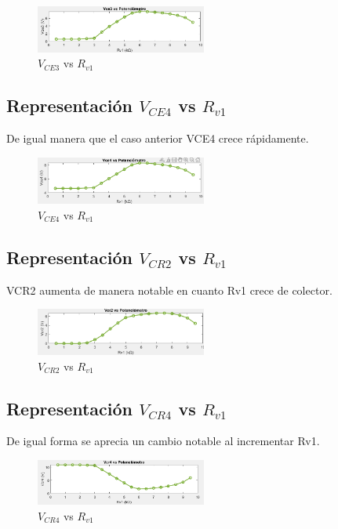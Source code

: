 \documentclass[conference]{IEEEtran}
\begin{document}
    \begin{figure}[h]
        \centering
        \includegraphics[width=0.5\textwidth]{media/IMAGENES MATLAB/VCE3_R.png}
          \caption{$V_{CE3}$ vs $R_{v1}$}
        \label{fig:vce3}
    \end{figure}
    
    \subsection{ Representación $V_{CE4}$ vs $R_{v1}$}
    De igual manera que el caso anterior VCE4 crece rápidamente.
    
    \begin{figure}[h]
        \centering
        \includegraphics[width=0.5\textwidth]{media/IMAGENES MATLAB/VCE4_R.png}
          \caption{$V_{CE4}$ vs $R_{v1}$}
        \label{fig:vce4}
    \end{figure}
    
    \subsection{ Representación $V_{CR2}$ vs $R_{v1}$}
    VCR2 aumenta de manera notable  en cuanto Rv1 crece de colector.
    
    \begin{figure}[h]
        \centering
        \includegraphics[width=0.5\textwidth]{media/IMAGENES MATLAB/VCR2_R.png}
        \caption{$V_{CR2}$ vs $R_{v1}$}
        \label{fig:vcr2}
    \end{figure}
    
    \newpage
    \subsection{ Representación $V_{CR4}$ vs $R_{v1}$}
    De igual forma se aprecia un cambio notable  al incrementar Rv1.
    \begin{figure}[h]
        \centering
        \includegraphics[width=0.5\textwidth]{media/IMAGENES MATLAB/VCR4_R.png}
        \caption{$V_{CR4}$ vs $R_{v1}$}
        \label{fig:vcr4}
    \end{figure}
    
\end{document}

